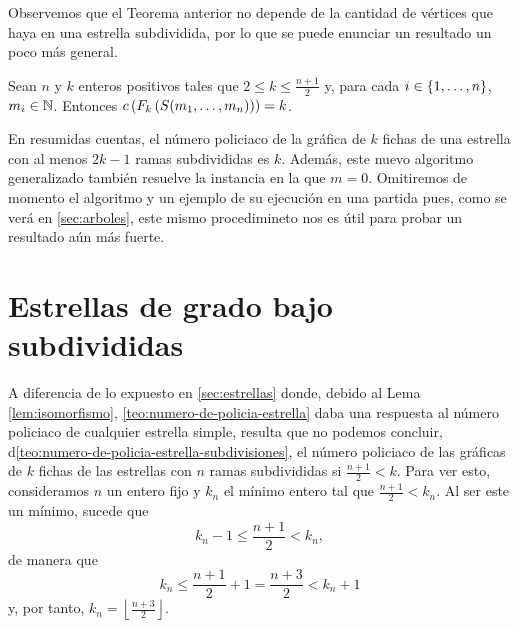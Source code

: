 Observemos que el Teorema anterior no depende de la cantidad de v\'ertices que
haya en una estrella subdividida, por lo que se puede enunciar un resultado un
poco m\'as general.

\begin{corolario}
\label{cor:cota-sup-1}
    Sean $n$ y $k$ enteros positivos tales que $2\leq k\leq \frac{n+1}{2}$ y,
    para cada $i\in \{1,\dots, n\}$, $m_i\in\mathbb{N}$. Entonces
    $c\left( F_{k}\left( S(m_1,\dots,m_n)\right)\right)=k$.
\end{corolario}

En resumidas cuentas, el n\'umero policiaco de la gr\'afica de $k$ fichas de una
estrella con al menos $2k-1$ ramas subdivididas es $k$. Adem\'as, este nuevo
algoritmo generalizado tambi\'en resuelve la instancia en la que $m=0$.
Omitiremos de momento el algoritmo y un ejemplo de su ejecuci\'on en una partida
pues, como se ver\'a en \cref{sec:arboles}, este mismo procedimineto nos es
\'util para probar un resultado a\'un m\'as fuerte.

\section{Estrellas de grado bajo subdivididas}
\label{sec:estrellasubbajo}

A diferencia de lo expuesto en \cref{sec:estrellas} donde, debido al Lema
\ref{lem:isomorfismo}, \cref{teo:numero-de-policia-estrella} daba una respuesta
al n\'umero policiaco de cualquier estrella simple, resulta que no podemos
concluir, d\cref{teo:numero-de-policia-estrella-subdivisiones}, el n\'umero
policiaco de las gr\'aficas de $k$ fichas de las estrellas con $n$ ramas
subdivididas si $\frac{n+1}{2} < k$. Para ver esto, consideramos $n$ un entero
fijo y $k_n$ el m\'inimo entero tal que $\frac{n+1}{2}<k_n$. Al ser este un
m\'inimo, sucede que
\[
    k_n-1 \leq \frac{n+1}{2} < k_n,
\]
de manera que
\[
    k_n\leq \frac{n + 1}{2} + 1 = \frac{n+3}{2} < k_n + 1
\]
y, por tanto, $k_n=\left \lfloor \frac{n+3}{2} \right \rfloor$.

\newpage

